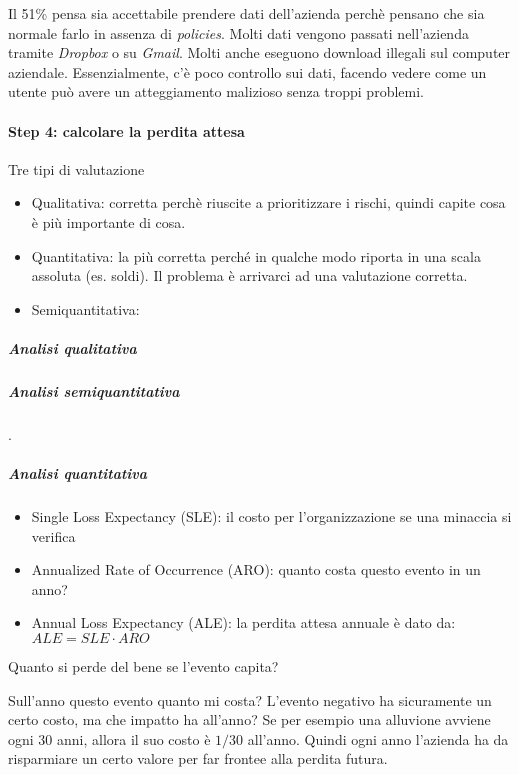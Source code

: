 Il 51\% pensa sia accettabile prendere dati dell'azienda perchè pensano che sia 
normale farlo in assenza di \textit{policies}. Molti dati vengono passati 
nell'azienda tramite \textit{Dropbox} o su \textit{Gmail}. Molti anche eseguono 
download illegali sul computer aziendale. Essenzialmente, c'è poco controllo sui 
dati, facendo vedere come un utente può avere un atteggiamento malizioso senza 
troppi problemi.


\paragraph*{Step 4: calcolare la perdita attesa}

Tre tipi di valutazione
\begin{itemize}
\item Qualitativa: corretta perchè riuscite a prioritizzare i rischi, quindi 
capite cosa è più importante di cosa.
\item Quantitativa: la più corretta perché in qualche modo riporta in una scala 
assoluta (es. soldi). Il problema è arrivarci ad una valutazione corretta.
\item Semiquantitativa: 
\end{itemize}

\subparagraph*{Analisi qualitativa}



\subparagraph*{Analisi semiquantitativa}


.

\subparagraph*{Analisi quantitativa}

\begin{itemize}
\item Single Loss Expectancy (SLE): il costo per l'organizzazione se una 
minaccia si verifica
\item Annualized Rate of Occurrence (ARO): quanto costa questo evento in un 
anno?
\item Annual Loss Expectancy (ALE): la perdita attesa annuale è dato da: $ALE = 
SLE \cdot ARO$
\end{itemize}


Quanto si perde del bene se l'evento capita? 

Sull'anno questo evento quanto mi costa? L'evento negativo ha sicuramente un 
certo costo, ma che impatto ha all'anno? Se per esempio una alluvione avviene 
ogni 30 anni, allora il suo costo è $1/30$ all'anno. Quindi ogni anno l'azienda 
ha da risparmiare un certo valore per far frontee alla perdita futura.

